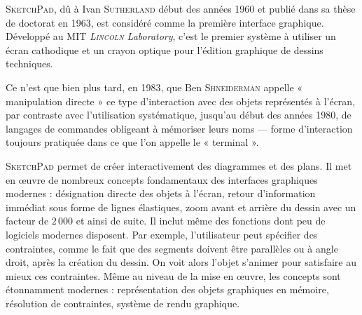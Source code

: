 

\textsc{SketchPad}, dû à Ivan \textsc{Sutherland} début des années 1960 et publié dans sa thèse de doctorat en 1963, est considéré comme la première interface graphique. Développé au MIT \textit{\textsc{Lincoln} Laboratory}, c'est le premier système à utiliser un écran cathodique et un crayon optique pour l'édition graphique de dessins techniques. 

Ce n'est que bien plus tard, en 1983, que Ben \textsc{Shneiderman} appelle « manipulation directe » ce type d'interaction avec des objets représentés à l'écran, par contraste avec l'utilisation systématique, jusqu'au début des années 1980, de langages de commandes obligeant à mémoriser leurs noms
--- forme d’interaction toujours pratiquée dans ce que l’on appelle
le « terminal ».

\textsc{SketchPad} permet de créer interactivement des diagrammes et des plans. Il met en œuvre de nombreux concepts fondamentaux des interfaces graphiques modernes : désignation directe des objets à l'écran, retour d'information immédiat sous forme de lignes élastiques, zoom avant et arrière du dessin avec un facteur de $2\,000$ et ainsi de suite. Il inclut même des fonctions dont peu de logiciels modernes disposent. Par exemple, l’utilisateur peut spécifier des contraintes, comme le fait que des segments doivent être parallèles ou à angle droit, après la création du dessin. On voit alors l’objet s’animer pour satisfaire au mieux ces contraintes. Même au niveau de la mise en œuvre, les concepts sont étonnamment modernes : représentation des objets graphiques en mémoire, résolution de contraintes, système de rendu graphique.

